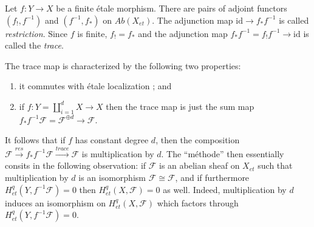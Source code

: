 \begin{definition}
\label{definition-trace-map}
Let $f : Y \to X$ be a finite \'etale morphism. There are pairs of adjoint
functors $(f_!,f^{-1})$ and $(f^{-1},f_*)$ on $\textit{Ab}(X_{et})$. The
adjunction map $\text{id} \to f_* f^{-1}$ is called {\it restriction}. Since
$f$ is finite, $f_! = f_*$ and the adjunction map $f_* f^{-1} = f_! f^{-1} \to
\text{id}$ is called the {\it trace}.
\end{definition}

\noindent
The trace map is characterized by the following two properties:
\begin{enumerate}
\item
it commutes with \'etale localization ; and
\item
if $f: Y = \coprod_{i=1}^d X \to X$ then the trace map is just the sum map $f_*
f^{-1} \mathcal{F} = \mathcal{F}^{\oplus d} \to \mathcal{F}$.
\end{enumerate}
It follows that if $f$ has constant degree $d$, then the composition
$\mathcal{F} \xrightarrow{res} f_* f^{-1} \mathcal{F} \xrightarrow{trace}
\mathcal{F}$ is multiplication by $d$. The ``m\'ethode'' then essentially
consits in the following observation: if $\mathcal{F}$ is an abelian sheaf on
$X_{et}$ such that multiplication by $d$ is an isomorphism $\mathcal{F} \cong
\mathcal{F}$, and if furthermore $H_{et}^q(Y,f^{-1}\mathcal{F}) = 0$ then
$H_{et}^q(X,\mathcal{F}) = 0$ as well. Indeed, multiplication by $d$ induces an
isomorphism on $H_{et}^q(X, \mathcal{F})$ which factors through
$H_{et}^q(Y,f^{-1}\mathcal{F})= 0$.

